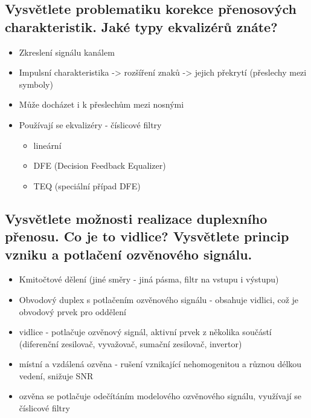\subsection{Vysvětlete problematiku korekce přenosových charakteristik. Jaké typy ekvalizérů znáte?}
\begin{itemize}
    \item Zkreslení signálu kanálem
    \item Impulsní charakteristika -> rozšíření znaků -> jejich překrytí (přeslechy mezi symboly)
    \item Může docházet i k přeslechům mezi nosnými
    \item Používají  se ekvalizéry - číslicové filtry
    \begin{itemize}
        \item lineární
        \item DFE (Decision Feedback Equalizer)
        \item TEQ (speciální případ DFE)
    \end{itemize}
\end{itemize}

\subsection{Vysvětlete možnosti realizace duplexního přenosu. Co je to vidlice? Vysvětlete princip
vzniku a potlačení ozvěnového signálu.}
\begin{itemize}
    \item Kmitočtové dělení (jiné směry - jiná pásma, filtr na vstupu i výstupu)
    \item Obvodový duplex s potlačením ozvěnového signálu - obsahuje vidlici, což je obvodový prvek pro oddělení
    \item vidlice - potlačuje ozvěnový signál, aktivní prvek z několika součástí (diferenční zesilovač, vyvažovač,
    sumační zesilovač, invertor)
    \item místní a vzdálená ozvěna - rušení vznikající nehomogenitou a různou délkou vedení, snižuje SNR
    \item ozvěna se potlačuje odečítáním modelového ozvěnového signálu, využívají se číslicové filtry
\end{itemize}
